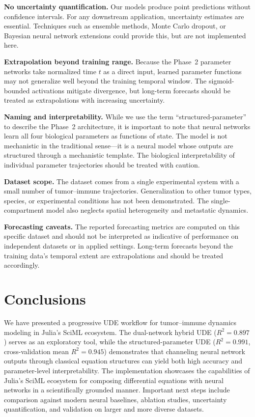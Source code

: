 \documentclass{juliacon}
\begin{document}
\textbf{No uncertainty quantification.} Our models produce point predictions without confidence intervals. For any downstream application, uncertainty estimates are essential. Techniques such as ensemble methods, Monte Carlo dropout, or Bayesian neural network extensions could provide this, but are not implemented here.

\textbf{Extrapolation beyond training range.} Because the Phase~2 parameter networks take normalized time $t$ as a direct input, learned parameter functions may not generalize well beyond the training temporal window. The sigmoid-bounded activations mitigate divergence, but long-term forecasts should be treated as extrapolations with increasing uncertainty.

\textbf{Naming and interpretability.} While we use the term ``structured-parameter'' to describe the Phase~2 architecture, it is important to note that neural networks learn all four biological parameters as functions of state. The model is not mechanistic in the traditional sense---it is a neural model whose outputs are structured through a mechanistic template. The biological interpretability of individual parameter trajectories should be treated with caution.

\textbf{Dataset scope.} The dataset comes from a single experimental system with a small number of tumor--immune trajectories. Generalization to other tumor types, species, or experimental conditions has not been demonstrated. The single-compartment model also neglects spatial heterogeneity and metastatic dynamics.

\textbf{Forecasting caveats.} The reported forecasting metrics are computed on this specific dataset and should not be interpreted as indicative of performance on independent datasets or in applied settings. Long-term forecasts beyond the training data's temporal extent are extrapolations and should be treated accordingly.

\section{Conclusions}

We have presented a progressive UDE workflow for tumor--immune dynamics modeling in Julia's SciML ecosystem. The dual-network hybrid UDE ($R^2 = 0.897$) serves as an exploratory tool, while the structured-parameter UDE ($R^2 = 0.991$, cross-validation mean $R^2 = 0.945$) demonstrates that channeling neural network outputs through classical equation structures can yield both high accuracy and parameter-level interpretability. The implementation showcases the capabilities of Julia's SciML ecosystem for composing differential equations with neural networks in a scientifically grounded manner. Important next steps include comparison against modern neural baselines, ablation studies, uncertainty quantification, and validation on larger and more diverse datasets.
\end{document}
